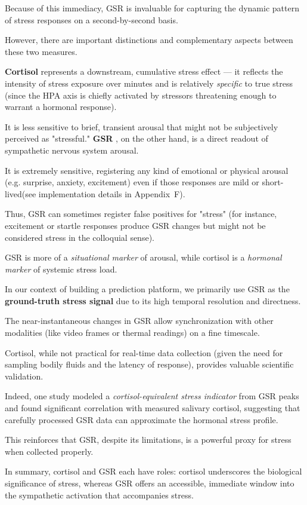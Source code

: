 Because of this immediacy, GSR is invaluable for capturing the dynamic pattern of stress responses on a second-by-second basis.

However, there are important distinctions and complementary aspects between these two measures.

\textbf{Cortisol}
 represents a downstream, cumulative stress effect --- it reflects the intensity of stress exposure over minutes and is relatively \textit{specific} to true stress (since the HPA axis is chiefly activated by stressors threatening enough to warrant a hormonal response).

It is less sensitive to brief, transient arousal that might not be subjectively perceived as "stressful." \textbf{GSR}
, on the other hand, is a direct readout of sympathetic nervous system arousal.

It is extremely sensitive, registering any kind of emotional or physical arousal (e.g. surprise, anxiety, excitement) even if those responses are mild or short-lived(see implementation details in Appendix~F).

Thus, GSR can sometimes register false positives for "stress" (for instance, excitement or startle responses produce GSR changes but might not be considered stress in the colloquial sense).

GSR is more of a \textit{situational marker} of arousal, while cortisol is a \textit{hormonal marker} of systemic stress load.

In our context of building a prediction platform, we primarily use GSR as the \textbf{ground-truth stress signal}
 due to its high temporal resolution and directness.

The near-instantaneous changes in GSR allow synchronization with other modalities (like video frames or thermal readings) on a fine timescale.

Cortisol, while not practical for real-time data collection (given the need for sampling bodily fluids and the latency of response), provides valuable scientific validation.

Indeed, one study modeled a \textit{cortisol-equivalent stress indicator} from GSR peaks and found significant correlation with measured salivary cortisol, suggesting that carefully processed GSR data can approximate the hormonal stress profile.

This reinforces that GSR, despite its limitations, is a powerful proxy for stress when collected properly.

In summary, cortisol and GSR each have roles: cortisol underscores the biological significance of stress, whereas GSR offers an accessible, immediate window into the sympathetic activation that accompanies stress.

